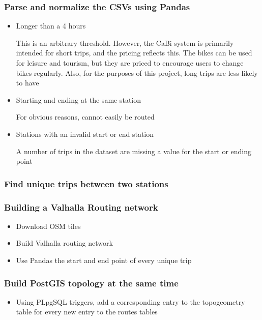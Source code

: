 \documentclass{beamer}
\begin{document}
\begin{frame}
    \frametitle{Parse and normalize the CSVs using Pandas}
    
\begin{itemize}
    \item Longer than a 4 hours
    
    This is an arbitrary threshold. However, the CaBi system is primarily intended for short trips, and the pricing reflects this. The bikes can be used for leisure and tourism, but they are priced to encourage users to change bikes regularly. Also, for the purposes of this project, long trips are less likely to have

    \item Starting and ending at the same station
    
    For obvious reasons, cannot easily be routed

    \item Stations with an invalid start or end station

    A number of trips in the dataset are missing a value for the start or ending point
\end{itemize}
    



    

   

\end{frame}

\begin{frame}
    \frametitle{Find unique trips between two stations}

\end{frame}

\begin{frame}
    \frametitle{Building a Valhalla Routing network}

    \begin{itemize}
        \item Download OSM tiles
        \item Build Valhalla routing network
        \item Use Pandas the start and end point of every unique trip
    \end{itemize}
\end{frame}

\begin{frame}
    \frametitle{Build PostGIS topology at the same time}
    \begin{itemize}
        \item Using PLpgSQL triggers, add a corresponding entry to the topogeometry table for every new entry to the routes tables
    \end{itemize}
\end{frame}
\end{document}
